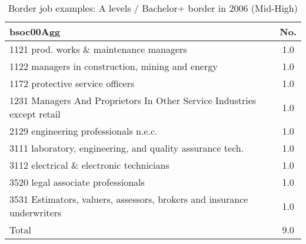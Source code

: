 \begin{table}[h!]
	\centering
	\caption{Border job examples: A levels / Bachelor+ border in 2006 (Mid-High)}
	\label{tab:360123}
	\begin{tabular}{lc}
	\toprule
bsoc00Agg&No. \\
\hline
1121 prod. works \& maintenance managers&1.0 \\
1122 managers in construction, mining and energy&1.0 \\
1172 protective service officers&1.0 \\
1231 Managers And Proprietors In Other Service Industries except retail&1.0 \\
2129 engineering professionals n.e.c.&1.0 \\
3111 laboratory, engineering, and quality assurance tech.&1.0 \\
3112 electrical \& electronic technicians&1.0 \\
3520 legal associate professionals&1.0 \\
3531 Estimators, valuers, assessors, brokers and insurance underwriters&1.0 \\
Total&9.0 \\
\bottomrule
\bottomrule
\end{tabular}
\end{table}
